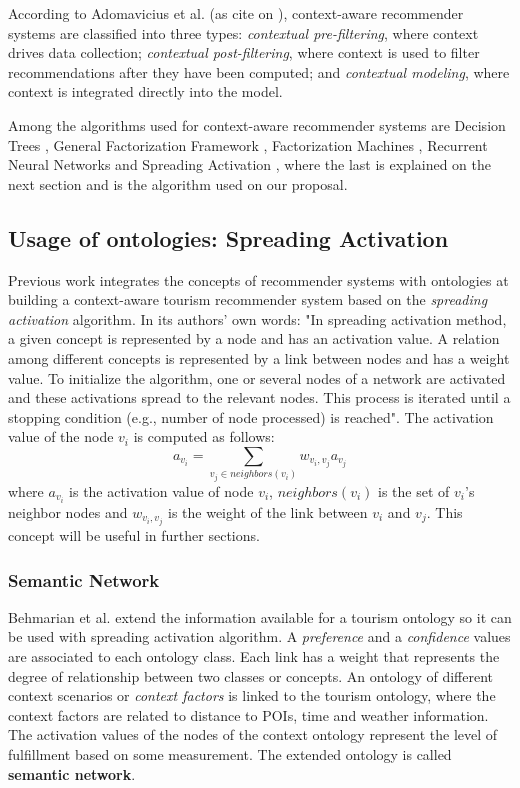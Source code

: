 According to Adomavicius et al. (as cite on \cite{pagano2016contextual}), context-aware recommender systems are classified into three types: \textit{contextual pre-filtering}, where context drives data collection; \textit{contextual post-filtering}, where context is used to filter recommendations after they have been computed; and \textit{contextual modeling}, where context is integrated directly into the model.

Among the algorithms used for context-aware recommender systems are Decision Trees \cite{pagano2016contextual}, General Factorization Framework \cite{hidasi2016general}, Factorization Machines \cite{rendle2011fast}, Recurrent Neural Networks \cite{pagano2016contextual} and Spreading Activation \cite{bahramian_abbaspour_claramunt_2017}, where the last is explained on the next section and is the algorithm used on our proposal.

\subsection{Usage of ontologies: Spreading Activation}
Previous work \cite{bahramian_abbaspour_claramunt_2017} integrates the concepts of recommender systems with ontologies at building a context-aware tourism recommender system based on the \textit{spreading activation} algorithm. In its authors' own words: "In spreading activation method, a given concept is represented by a node and has an activation value. A relation among different concepts is represented by a link between nodes and has a weight value. To initialize the algorithm, one or several nodes of a network are activated and these activations spread to the relevant nodes. This process is iterated until a stopping condition (e.g., number of node processed) is reached". The activation value of the node \(v_i\) is computed as follows:
\begin{equation} \label{eq:og_activation}
a_{v_i} = \sum_{v_j \in neighbors(v_i)} w_{v_i, v_j} a_{v_j} 
\end{equation}
where $a_{v_i}$ is the activation value of node $v_i$, $neighbors(v_i)$ is the set of $v_i$'s neighbor nodes and $w_{v_i, v_j}$ is the weight of the link between $v_i$ and $v_j$. This concept will be useful in further sections. 

\subsubsection{Semantic Network}
Behmarian et al. \cite{bahramian_abbaspour_claramunt_2017} extend the information available for a tourism ontology so it can be used with spreading activation algorithm. A \textit{preference} and a \textit{confidence} values are associated to each ontology class. Each link has a weight that represents the degree of relationship between two classes or concepts. An ontology of different context scenarios or \textit{context factors} is linked to the tourism ontology, where the context factors are related to distance to POIs, time and weather information. The activation values of the nodes of the context ontology represent the level of fulfillment based on some measurement. The extended ontology is called \textbf{semantic network}.

